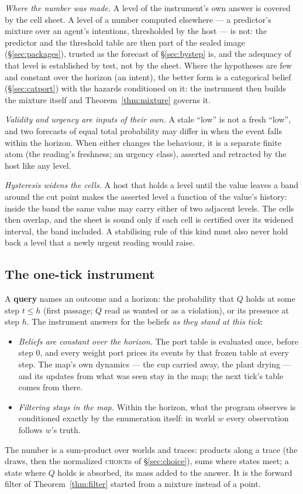 \documentclass[11pt]{article}
\theoremstyle{plain}
\theoremstyle{definition}
\theoremstyle{remark}
\begin{document}
\emph{Where the number was made.} A level of the instrument's own
answer is covered by the cell sheet. A level of a number computed
elsewhere --- a predictor's mixture over an agent's intentions,
thresholded by the host --- is not: the predictor and the threshold
table are then part of the sealed image (\S\ref{sec:packages}), trusted
as the forecast of \S\ref{sec:bystep} is, and the adequacy of that
level is established by test, not by the sheet. Where the hypotheses
are few and constant over the horizon (an intent), the better form is a
categorical belief (\S\ref{sec:catport}) with the hazards conditioned
on it: the instrument then builds the mixture itself and
Theorem~\ref{thm:mixture} governs it.

\emph{Validity and urgency are inputs of their own.} A stale ``low'' is
not a fresh ``low'', and two forecasts of equal total probability may
differ in when the event falls within the horizon. When either changes
the behaviour, it is a separate finite atom (the reading's freshness;
an urgency class), asserted and retracted by the host like any level.

\emph{Hysteresis widens the cells.} A host that holds a level until the
value leaves a band around the cut point makes the asserted level a
function of the value's history: inside the band the same value may
carry either of two adjacent levels. The cells then overlap, and the
sheet is sound only if each cell is certified over its widened
interval, the band included. A stabilising rule of this kind must also
never hold back a level that a newly urgent reading would raise.

\subsection{The one-tick instrument}\label{sec:instrument}

A \textbf{query} names an outcome and a horizon: the probability that
$Q$ holds at some step $t \le h$ (first passage; $Q$ read as wanted or
as a violation), or its presence at step $h$. The instrument answers for
the beliefs \emph{as they stand at this tick}:
\begin{itemize}[leftmargin=2em]
\item \emph{Beliefs are constant over the horizon.} The port table is
  evaluated once, before step $0$, and every weight port prices its
  events by that frozen table at every step. The map's own dynamics ---
  the cup carried away, the plant drying --- and its updates from what
  was seen stay in the map; the next tick's table comes from there.
\item \emph{Filtering stays in the map.} Within the horizon, what the
  program observes is conditioned exactly by the enumeration itself: in
  world $w$ every observation follows $w$'s truth.
\end{itemize}
The number is a sum-product over worlds and traces: products along a
trace (the draws, then the normalized \textsc{choice}s of
\S\ref{sec:choice}), sums where states meet; a state where $Q$ holds is
absorbed, its mass added to the answer. It is the forward filter of
Theorem~\ref{thm:filter} started from a mixture instead of a point.
\end{document}
